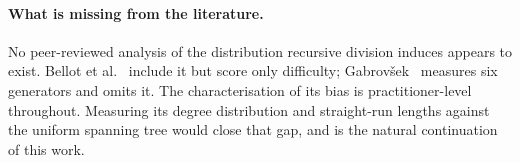 \paragraph{What is missing from the literature.}
No peer-reviewed analysis of the distribution recursive division induces appears
to exist. Bellot et al.~\cite{bellot2021how} include it but score only
difficulty; Gabrov\v{s}ek~\cite{gabrovsek2019analysis} measures six generators
and omits it. The characterisation of its bias is practitioner-level throughout.
Measuring its degree distribution and straight-run lengths against the uniform
spanning tree would close that gap, and is the natural continuation of this
work.

